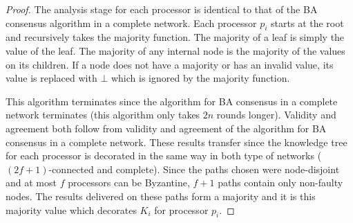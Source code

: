 \documentclass[11pt]{article}
\begin{document}
\begin{proof}
The analysis stage for each processor is identical to that of the BA consensus algorithm in a complete network. Each processor $p_i$ starts at the root and recursively takes the majority function. The majority of a leaf is simply the value of the leaf. The majority of any internal node is the majority of the values on its children. If a node does not have a majority or has an invalid value, its value is replaced with $\bot$ which is ignored by the majority function.

This algorithm terminates since the algorithm for BA consensus in a complete network terminates (this algorithm only takes $2n$ rounds longer). Validity and agreement both follow from validity and agreement of the algorithm for BA consensus in a complete network. These results transfer since the knowledge tree for each processor is decorated in the same way in both type of networks ($(2f+1)$-connected and complete). Since the paths chosen were node-disjoint and at most $f$ processors can be Byzantine, $f+1$ paths contain only non-faulty nodes. The results delivered on these paths form a majority and it is this majority value which decorates $K_i$ for processor $p_i$. 

\end{proof}
\end{document}
